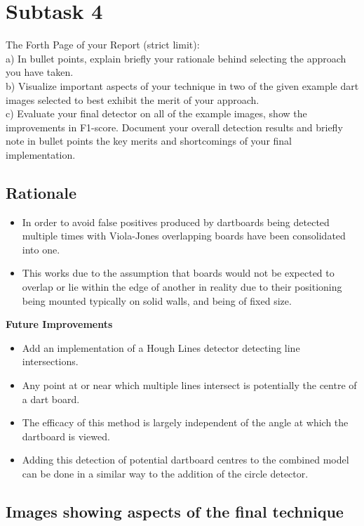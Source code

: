 \documentclass[conference]{IEEEtran}
\begin{document}
\newpage
\section{Subtask 4}



The Forth Page of your Report (strict limit):\\
a) In bullet points, explain briefly your rationale behind
selecting the approach you have taken.\\
b) Visualize important aspects of your technique in two of
the given example dart images selected to best exhibit the
merit of your approach.\\
c) Evaluate your final detector on all of the example images,
show the improvements in F1-score. Document your
overall detection results and briefly note in bullet points
the key merits and shortcomings of your final
implementation.

\subsection{Rationale}
\begin{itemize}
	\item In order to avoid false positives produced by dartboards being detected multiple times with Viola-Jones overlapping boards have been consolidated into one.
	\item This works due to the assumption that boards would not be expected to overlap or lie within the edge of another in reality due to their positioning being mounted typically on solid walls, and being of fixed size.
\end{itemize}

\textbf{Future Improvements}
\begin{itemize}
	\item Add an implementation of a Hough Lines detector detecting line intersections. 
	\item Any point at or near which multiple lines intersect is potentially the centre of a dart board.
	\item The efficacy of this method is largely independent of the angle at which the dartboard is viewed.
	\item Adding this detection of potential dartboard centres to the combined model can be done in a similar way to the addition of the circle detector.
\end{itemize}

\subsection{Images showing aspects of the final technique}
\end{document}
